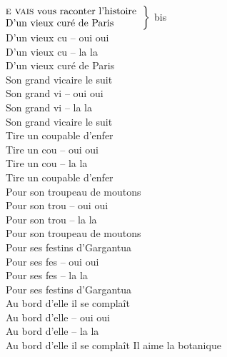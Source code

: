 
$\left.\begin{tabular}{l}
\hspace{-0.4cm}
\textsc{e vais} vous raconter l'histoire
\\
\hspace{-0.4cm}
D'un vieux curé de Paris
\end{tabular}\right\rbrace$ bis
\\D'un vieux cu -- oui oui
\\D'un vieux cu -- la la
\\D'un vieux curé de Paris
\\
{Son grand vicaire le suit}
\\Son grand vi -- oui oui
\\Son grand vi -- la la
\\Son grand vicaire le suit
\\
{Tire un coupable d'enfer}
\\Tire un cou -- oui oui
\\Tire un cou -- la la
\\Tire un coupable d'enfer
\\
{Pour son troupeau de moutons}
\\Pour son trou -- oui oui
\\Pour son trou -- la la
\\Pour son troupeau de moutons
\\
{Pour ses festins d'Gargantua}
\\Pour ses fes -- oui oui
\\Pour ses fes -- la la
\\Pour ses festins d'Gargantua
\\
{Au bord d'elle il se complaît}
\\Au bord d'elle -- oui oui
\\Au bord d'elle -- la la
\\Au bord d'elle il se complaît
\breakpage
Il aime la botanique

